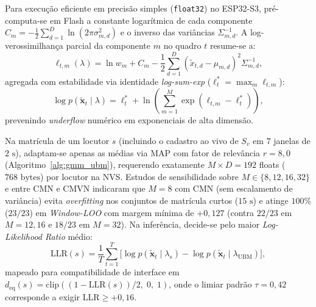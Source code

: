 \documentclass[9pt,technote,a4paper]{IEEEtran}
\begin{document}
Para execução eficiente em precisão simples (\texttt{float32}) no ESP32-S3, pré-computa-se em Flash a constante logarítmica de cada componente $C_m = -\frac{1}{2}\sum_{d=1}^{D}\ln(2\pi \sigma_{m,d}^2)$ e o inverso das variâncias $\Sigma_{m,d}^{-1}$. A log-verossimilhança parcial da componente $m$ no quadro $t$ resume-se a:
\begin{equation}
    \ell_{t, m}(\lambda) = \ln w_m + C_m - \frac{1}{2}\sum_{d=1}^{D} \left(\tilde{x}_{t,d} - \mu_{m,d}\right)^2 \Sigma_{m,d}^{-1},
\end{equation}
agregada com estabilidade via identidade \textit{log-sum-exp} ($\ell_t^* = \max_m \ell_{t,m}$):
\begin{equation}
    \log p(\tilde{\mathbf{x}}_t \mid \lambda) = \ell_t^* + \ln\!\left(\sum_{m=1}^{M} \exp(\ell_{t,m} - \ell_t^*)\right),
\end{equation}
prevenindo \textit{underflow} numérico em exponenciais de alta dimensão.

Na matrícula de um locutor $s$ (incluindo o cadastro ao vivo de $S_v$ em $7$ janelas de $2\text{ s}$), adaptam-se apenas as médias via MAP com fator de relevância $r = 8{,}0$ (Algoritmo~\ref{alg:gmm_ubm}), requerendo exatamente $M \times D = 192$ floats ($768\text{ bytes}$) por locutor na NVS. Estudos de sensibilidade sobre $M \in \{8, 12, 16, 32\}$ e entre CMN e CMVN indicaram que $M = 8$ com CMN (sem escalamento de variância) evita \textit{overfitting} nos conjuntos de matrícula curtos ($15\text{ s}$) e atinge $100\%$ ($23/23$) em \textit{Window-LOO} com margem mínima de $+0{,}127$ (contra $22/23$ em $M=12, 16$ e $18/23$ em $M=32$). Na inferência, decide-se pelo maior \textit{Log-Likelihood Ratio} médio:
\begin{equation}
    \mathrm{LLR}(s) = \frac{1}{T}\sum_{t=1}^{T}\Big[\log p(\tilde{\mathbf{x}}_t \mid \lambda_s) - \log p(\tilde{\mathbf{x}}_t \mid \lambda_{\mathrm{UBM}})\Big],
\end{equation}
mapeado para compatibilidade de interface em $d_{\mathrm{eq}}(s) = \mathrm{clip}((1 - \mathrm{LLR}(s))/2,\; 0,\; 1)$, onde o limiar padrão $\tau = 0{,}42$ corresponde a exigir $\mathrm{LLR} \ge +0{,}16$.
\end{document}
